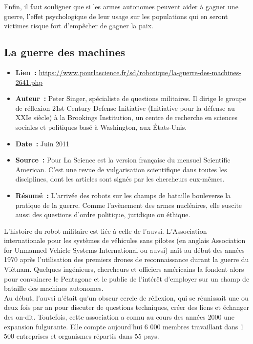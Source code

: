 \documentclass[8pt]{article}
\begin{document}
Enfin, il faut souligner que si les armes autonomes peuvent aider à gagner une guerre, l’effet psychologique de leur usage sur les populations qui en seront victimes risque fort d’empêcher de gagner la paix.\\

\newpage
\subsection{La guerre des machines}
\label{sec:machines}

\begin{itemize}
	\item \textbf{Lien~: }  \url{https://www.pourlascience.fr/sd/robotique/la-guerre-des-machines-2641.php} 
	\item \textbf{Auteur~: } Peter Singer, spécialiste
	de questions militaires.
	Il dirige le groupe de réflexion
	21st Century Defense Initiative
	(Initiative pour la défense
	au XXIe siècle) à la Brookings
	Institution, un centre
	de recherche en sciences
	sociales et politiques basé
	à Washington, aux États-Unis.
	\item \textbf{Date~: }  Juin 2011 
	\item \textbf{Source~: } Pour La Science est la version française du mensuel Scientific American. C'est une revue de vulgarisation scientifique dans toutes les disciplines, dont les articles sont signés par les chercheurs eux-mêmes.
	\item \textbf{Résumé~: } L'arrivée des robots sur les champs de bataille bouleverse la pratique de la guerre. Comme l'avènement des armes nucléaires, elle suscite aussi des questions d'ordre politique, juridique ou éthique.
\end{itemize}

L’histoire du robot militaire est liée à celle de l’auvsi. L’Association internationale pour les systèmes de véhicules sans pilotes (en anglais Association for Unmanned Vehicle Systems International ou auvsi) naît au début des années 1970 après l’utilisation des premiers drones de reconnaissance durant la guerre du Viêtnam. Quelques ingénieurs, chercheurs et officiers américains la fondent alors pour convaincre le Pentagone et le public de l’intérêt d’employer sur un champ de bataille des machines autonomes.\\

Au début, l’auvsi n’était qu’un obscur cercle de réflexion, qui se réunissait une ou deux fois par an pour discuter de questions techniques, créer des liens et échanger des on-dit. Toutefois, cette association a connu au cours des années 2000 une expansion fulgurante. Elle compte aujourd’hui 6 000 membres travaillant dans 1 500 entreprises et organismes répartis dans 55 pays.\\
\end{document}
